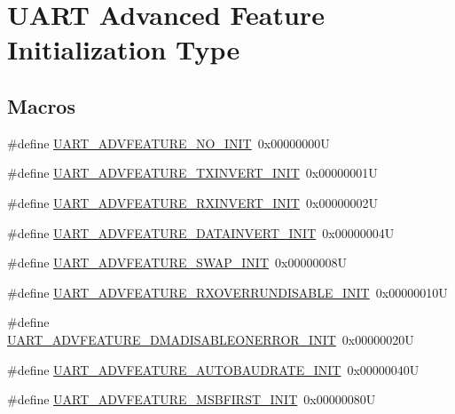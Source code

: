\hypertarget{group___u_a_r_t___advanced___features___initialization___type}{}\section{U\+A\+RT Advanced Feature Initialization Type}
\label{group___u_a_r_t___advanced___features___initialization___type}
\subsection*{Macros}
\begin{DoxyCompactItemize}
\item 
\#define \mbox{\hyperlink{group___u_a_r_t___advanced___features___initialization___type_gab696b28f33174d038e0bfd300c1b2a77}{U\+A\+R\+T\+\_\+\+A\+D\+V\+F\+E\+A\+T\+U\+R\+E\+\_\+\+N\+O\+\_\+\+I\+N\+IT}}~0x00000000U
\item 
\#define \mbox{\hyperlink{group___u_a_r_t___advanced___features___initialization___type_ga17c49d1895d43bfd6e0cf993103731ae}{U\+A\+R\+T\+\_\+\+A\+D\+V\+F\+E\+A\+T\+U\+R\+E\+\_\+\+T\+X\+I\+N\+V\+E\+R\+T\+\_\+\+I\+N\+IT}}~0x00000001U
\item 
\#define \mbox{\hyperlink{group___u_a_r_t___advanced___features___initialization___type_gad5a4923f3e771d276c6a5332e3945e2a}{U\+A\+R\+T\+\_\+\+A\+D\+V\+F\+E\+A\+T\+U\+R\+E\+\_\+\+R\+X\+I\+N\+V\+E\+R\+T\+\_\+\+I\+N\+IT}}~0x00000002U
\item 
\#define \mbox{\hyperlink{group___u_a_r_t___advanced___features___initialization___type_ga3066937ab29631f78820865605e83628}{U\+A\+R\+T\+\_\+\+A\+D\+V\+F\+E\+A\+T\+U\+R\+E\+\_\+\+D\+A\+T\+A\+I\+N\+V\+E\+R\+T\+\_\+\+I\+N\+IT}}~0x00000004U
\item 
\#define \mbox{\hyperlink{group___u_a_r_t___advanced___features___initialization___type_ga56b48c24063e0f04b09f592c3ce7d2ac}{U\+A\+R\+T\+\_\+\+A\+D\+V\+F\+E\+A\+T\+U\+R\+E\+\_\+\+S\+W\+A\+P\+\_\+\+I\+N\+IT}}~0x00000008U
\item 
\#define \mbox{\hyperlink{group___u_a_r_t___advanced___features___initialization___type_ga053355b64de3105a19f3e5560f3557e4}{U\+A\+R\+T\+\_\+\+A\+D\+V\+F\+E\+A\+T\+U\+R\+E\+\_\+\+R\+X\+O\+V\+E\+R\+R\+U\+N\+D\+I\+S\+A\+B\+L\+E\+\_\+\+I\+N\+IT}}~0x00000010U
\item 
\#define \mbox{\hyperlink{group___u_a_r_t___advanced___features___initialization___type_gafd2fb1991911b82d75556eafe228ef90}{U\+A\+R\+T\+\_\+\+A\+D\+V\+F\+E\+A\+T\+U\+R\+E\+\_\+\+D\+M\+A\+D\+I\+S\+A\+B\+L\+E\+O\+N\+E\+R\+R\+O\+R\+\_\+\+I\+N\+IT}}~0x00000020U
\item 
\#define \mbox{\hyperlink{group___u_a_r_t___advanced___features___initialization___type_ga09fdbb71292c899d6dc89a41e5752564}{U\+A\+R\+T\+\_\+\+A\+D\+V\+F\+E\+A\+T\+U\+R\+E\+\_\+\+A\+U\+T\+O\+B\+A\+U\+D\+R\+A\+T\+E\+\_\+\+I\+N\+IT}}~0x00000040U
\item 
\#define \mbox{\hyperlink{group___u_a_r_t___advanced___features___initialization___type_ga911654f44cd040f41871ec5af5ec1343}{U\+A\+R\+T\+\_\+\+A\+D\+V\+F\+E\+A\+T\+U\+R\+E\+\_\+\+M\+S\+B\+F\+I\+R\+S\+T\+\_\+\+I\+N\+IT}}~0x00000080U
\end{DoxyCompactItemize}


